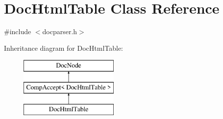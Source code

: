 \hypertarget{class_doc_html_table}{}\section{Doc\+Html\+Table Class Reference}
\label{class_doc_html_table}


{\ttfamily \#include $<$docparser.\+h$>$}

Inheritance diagram for Doc\+Html\+Table\+:\begin{figure}[H]
\begin{center}
\leavevmode
\includegraphics[height=3.000000cm]{class_doc_html_table}
\end{center}
\end{figure}
